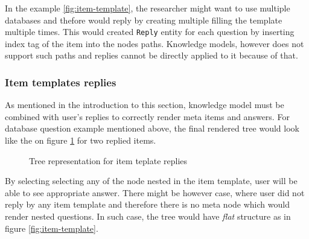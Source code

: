 In the example \ref{fig:item-template}, the researcher might want to use multiple databases and thefore would reply by creating multiple filling the template multiple times.
This would created \texttt{Reply} entity for each question by inserting index tag of the item into the nodes paths.
Knowledge models, however does not support such paths and replies cannot be directly applied to it because of that.

\subsubsection*{Item templates replies}

As mentioned in the introduction to this section, knowledge model must be combined with user's replies to correctly render meta items and answers.
For database question example mentioned above, the final rendered tree would look like the on figure \ref{fig:item-template-items} for two replied items.

\begin{figure}[H]
    \caption{Tree representation for item teplate replies}\label{fig:item-template-items}
\end{figure}

By selecting selecting any of the node nested in the item template, user will be able to see appropriate answer.
There might be however case, where user did not reply by any item template and therefore there is no meta node which would render nested questions.
In such case, the tree would have \textit{flat} structure as in figure \ref{fig:item-template}.
